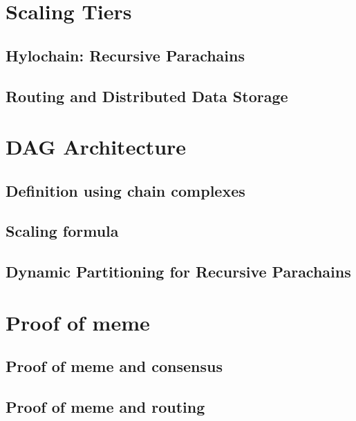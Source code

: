 \documentclass{article}
\begin{document}
\section{Scaling Tiers}
\subsection{Hylochain: Recursive Parachains}
\subsection{Routing and Distributed Data Storage}

\section{DAG Architecture}
\subsection{Definition using chain complexes}
\subsection{Scaling formula}
\subsection{Dynamic Partitioning for Recursive Parachains}


\section{Proof of meme}
\subsection{Proof of meme and consensus}
\subsection{Proof of meme and routing}



\end{document}
